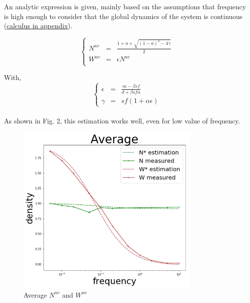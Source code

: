 \documentclass{article}
\begin{document}
An analytic expression is given, mainly based on the assumptions that frequency is high enough to consider that the global dynamics of the system is continuous (\hyperref[average]{calculus in appendix}).


\[
\left\lbrace
\begin{array}{rcl}
N^{av} & = & \frac{1+a+\sqrt{(1-a)^2-4\gamma}}{2} \\
W^{av} & = & \epsilon N^{av} \\
\end{array}
\right.
\]

With,
\[
\left\lbrace
\begin{array}{rcl}
\epsilon & = & \frac{m-\beta s f}{d + \beta s f \alpha} \\
\gamma & = & sf(1+\alpha\epsilon)
\end{array}
\right.
\]

\paragraph{}
As shown in Fig. 2, this estimation works well, even for low value of frequency.

\begin{figure}[h!]
\centering
\includegraphics[width=9cm]{average.png}
\caption{Average $N^{av}$ and $W^{av}$}
\end{figure}




\end{document}
